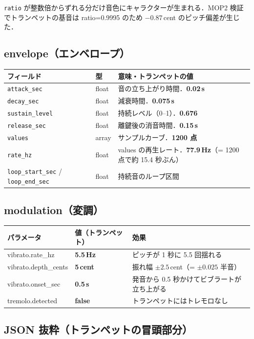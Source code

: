 \documentclass[uplatex,dvipdfmx,a4paper,10pt]{jsarticle}
\begin{document}
\texttt{ratio} が整数倍からずれる分だけ音色にキャラクターが生まれる．MOP2 検証でトランペットの基音は ratio=0.9995 のため $-0.87$\,cent のピッチ偏差が生じた．

\subsection{envelope（エンベロープ）}

\begin{tabularx}{\textwidth}{llX}
\toprule
フィールド & 型 & 意味・トランペットの値 \\
\midrule
\texttt{attack\_sec}   & float  & 音の立ち上がり時間．\textbf{0.02\,s} \\
\texttt{decay\_sec}    & float  & 減衰時間．\textbf{0.075\,s} \\
\texttt{sustain\_level} & float & 持続レベル（0--1）．\textbf{0.676} \\
\texttt{release\_sec}  & float  & 離鍵後の消音時間．\textbf{0.15\,s} \\
\texttt{values}        & array  & サンプルカーブ．\textbf{1200 点} \\
\texttt{rate\_hz}      & float  & values の再生レート．\textbf{77.9\,Hz}（= 1200 点で約 15.4 秒ぶん） \\
\texttt{loop\_start\_sec} / \texttt{loop\_end\_sec} & float & 持続音のループ区間 \\
\bottomrule
\end{tabularx}

\subsection{modulation（変調）}

\begin{tabularx}{\textwidth}{llX}
\toprule
パラメータ & 値（トランペット） & 効果 \\
\midrule
vibrato.rate\_hz      & \textbf{5.5\,Hz} & ピッチが 1 秒に 5.5 回揺れる \\
vibrato.depth\_cents  & \textbf{5\,cent}  & 振れ幅 $\pm2.5$\,cent（= $\pm0.025$ 半音） \\
vibrato.onset\_sec    & \textbf{0.5\,s}   & 発音から 0.5 秒かけてビブラートが立ち上がる \\
tremolo.detected      & \textbf{false}    & トランペットにはトレモロなし \\
\bottomrule
\end{tabularx}

\subsection{JSON 抜粋（トランペットの冒頭部分）}
\end{document}
